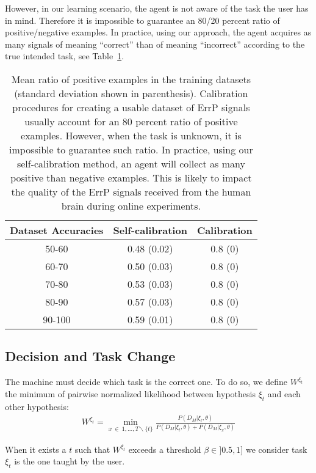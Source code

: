 However, in our learning scenario, the agent is not aware of the task the user has in mind. Therefore it is impossible to guarantee an 80/20 percent ratio of positive/negative examples. In practice, using our approach, the agent acquires as many signals of meaning ``correct'' than of meaning ``incorrect'' according to the true intended task, see Table~\ref{tab:correctLabelRatio}.

\begin{table}
\centering
{}
\begin{tabular}{c c c}
Dataset Accuracies & Self-calibration & Calibration \\ \hline
50-60 & 0.48 (0.02) & 0.8 (0) \\
60-70 & 0.50 (0.03) & 0.8 (0) \\
70-80 & 0.53 (0.03) & 0.8 (0) \\
80-90 & 0.57 (0.03) & 0.8 (0) \\
90-100 & 0.59 (0.01) & 0.8 (0) \\
\end{tabular}
\caption{Mean ratio of positive examples in the training datasets (standard deviation shown in parenthesis). Calibration procedures for creating a usable dataset of ErrP signals usually account for an 80 percent ratio of positive examples. However, when the task is unknown, it is impossible to guarantee such ratio. In practice, using our self-calibration method, an agent will collect as many positive than negative examples. This is likely to impact the quality of the ErrP signals received from the human brain during online experiments.}
\label{tab:correctLabelRatio}
\end{table}



\subsection{Decision and Task Change}

The machine must decide which task is the correct one. To do so, we define $W^{\xi_t}$ the minimum of pairwise normalized likelihood between hypothesis $\xi_t$ and each other hypothesis: 
%
\begin{eqnarray}
W^{\xi_t} = \min_{x~\in~{1, \ldots, T} \smallsetminus \{t\}} \frac{P(D_M | \xi_t, \theta)}{P(D_M | \xi_t, \theta) + P(D_M | \xi_x, \theta)}
\label{eq:weight}
\end{eqnarray}

When it exists a $t$ such that $W^{\xi_t}$ exceeds a threshold $\beta \in ]0.5,1]$ we consider task $\xi_t$ is the one taught by the user.

